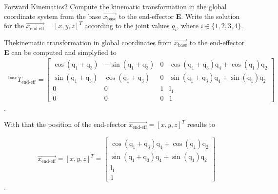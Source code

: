 \begin{questions}


\begin{question}{Forward Kinematics}{2}
Compute the kinematic transformation in the global coordinate system from the base $\vec{x_\textrm{base}}$ to the end-effector \textbf{E}.  
Write the solution for the $\vec{x_\textrm{end-eff}}=[x,y,z]^T$  according to the joint values $q_i$, where $i \in \{1,2,3,4\}$.

\begin{answer}
Thekinematic transformation in global coordinates from  $\vec{x_\textrm{base}}$ to the end-effector \textbf{E} can be computed and simplyfied to
\begin{align*}
~^\textrm{base}\!T_{\textrm{end-eff}} &= 
\begin{bmatrix}
\cos(\textrm{q}_{\textrm{1}}+\textrm{q}_{\textrm{3}}) & -\sin(\textrm{q}_{\textrm{1}}+\textrm{q}_{\textrm{3}})& 0 & \cos(\textrm{q}_{\textrm{1}}+\textrm{q}_{\textrm{3}})\textrm{q}_{\textrm{4}} + \cos(\textrm{q}_{\textrm{1}})\textrm{q}_{\textrm{2}} \\
\sin(\textrm{q}_{\textrm{1}}+\textrm{q}_{\textrm{3}}) &\cos(\textrm{q}_{\textrm{1}}+\textrm{q}_{\textrm{3}})  & 0 & \sin(\textrm{q}_{\textrm{1}}+\textrm{q}_{\textrm{3}})\textrm{q}_{\textrm{4}} + \sin(\textrm{q}_{\textrm{1}})\textrm{q}_{\textrm{2}} \\
0 & 0 & 1 & \textrm{l}_{\textrm{1}} \\
0 & 0 & 0 & 1 
\end{bmatrix}
\end{align*}.

With that the position of the end-efector $\vec{x_\textrm{end-eff}}=[x,y,z]^T$ results to

\begin{align*}
\vec{x_\textrm{end-eff}}=[x,y,z]^T = \begin{bmatrix}
\cos(\textrm{q}_{\textrm{1}}+\textrm{q}_{\textrm{3}})\textrm{q}_{\textrm{4}} + \cos(\textrm{q}_{\textrm{1}})\textrm{q}_{\textrm{2}} \\
\sin(\textrm{q}_{\textrm{1}}+\textrm{q}_{\textrm{3}})\textrm{q}_{\textrm{4}} + \sin(\textrm{q}_{\textrm{1}})\textrm{q}_{\textrm{2}} \\
\textrm{l}_{\textrm{1}} \\
1 
\end{bmatrix}
\end{align*}.


\end{answer}
\end{question}
\end{questions}
